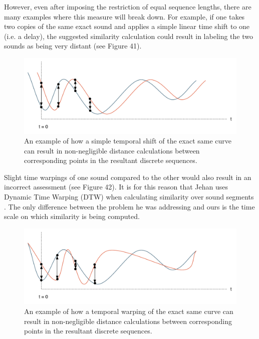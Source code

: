 \documentclass[12pt]{report} 	%
\numberwithin{figure}{chapter}
\numberwithin{table}{chapter}
\numberwithin{equation}{chapter}
\begin{document}
\begin{flushleft}
However, even after imposing the restriction of equal sequence lengths, there are many examples where this measure will break down. For example, if one takes two copies of the same exact sound and applies a simple linear time shift to one (i.e. a delay), the suggested similarity calculation could result in labeling the two sounds as being very distant (see Figure 41).
\begin{figure}[h!]
\begin{center}
\includegraphics[scale=0.6]{TimbreDistance3}
\caption[Timbre distance between time-shifted curves]{An example of how a simple temporal shift of the exact same curve can result in non-negligible distance calculations between corresponding points in the resultant discrete sequences.}
\end{center}
\end{figure}

Slight time warpings of one sound compared to the other would also result in an incorrect assessment (see Figure 42). It is for this reason that Jehan uses Dynamic Time Warping (DTW) when calculating similarity over sound segments \cite{Jehan:2005fy}. The only difference between the problem he was addressing and ours is the time scale on which similarity is being computed.
\begin{figure}[h!]
\begin{center}
\includegraphics[scale=0.6]{TimbreDistance4}
\caption[Timbre distance between time-warped curves]{An example of how a temporal warping of the exact same curve can result in non-negligible distance calculations between corresponding points in the resultant discrete sequences.}
\end{center}
\end{figure}


\end{flushleft}
\end{document}
